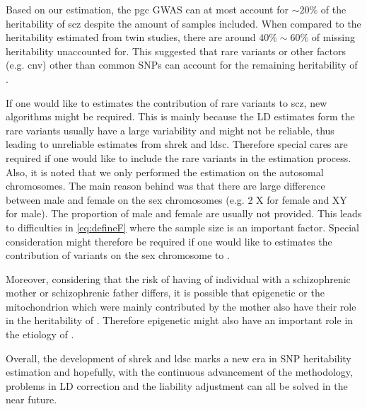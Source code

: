 	Based on our estimation, the \gls{pgc}  \gls{GWAS} can at most account for $\sim20\%$ of the heritability of \gls{scz} despite the amount of samples included.
	When compared to the heritability estimated from twin studies, there are around $40\%\sim60\%$ of missing heritability unaccounted for. 
	This suggested that rare variants or other factors (e.g. \gls{cnv}) other than common \glspl{SNP} can account for the remaining heritability of .
	
	If one would like to estimates the contribution of rare variants to \gls{scz}, new algorithms might be required. 
	This is mainly because the \gls{LD} estimates form the rare variants usually have a large variability and might not be reliable, thus leading to unreliable estimates from \gls{shrek} and \gls{ldsc}.
	Therefore special cares are required if one would like to include the rare variants in the estimation process.
	Also, it is noted that we only performed the estimation on the autosomal chromosomes.
	The main reason behind was that there are large difference between male and female on the sex chromosomes (e.g. 2 X for female and XY for male).
	The proportion of male and female are usually not provided. 
	This leads to difficulties in \cref{eq:defineF} where the sample size is an important factor.
	Special consideration might therefore be required if one would like to estimates the contribution of variants on the sex chromosome to .
	
	Moreover, considering that the risk of having  of individual with a schizophrenic mother or schizophrenic father differs, it is possible that epigenetic or the mitochondrion which were mainly contributed by the mother also have their role in the heritability of . 
	Therefore epigenetic might also have an important role in the etiology of .

	Overall, the development of \gls{shrek} and \gls{ldsc} marks a new era in \gls{SNP} heritability estimation and hopefully, with the continuous advancement of the methodology, problems in \gls{LD} correction and the liability adjustment can all be solved in the near future.
	
	

